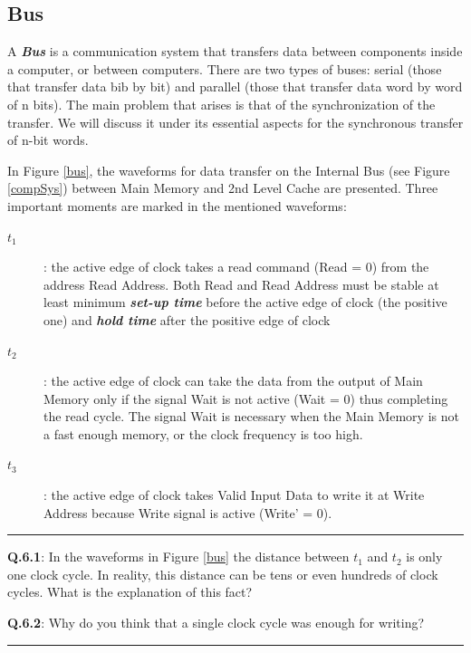 \subsection{Bus}

A {\bf {\em Bus}} is a communication system that transfers data between components inside a computer, or between computers. There are two types of buses: serial (those that transfer data bib by bit) and parallel (those that transfer data word by word of n bits). The main problem that arises is that of the synchronization of the transfer. We will discuss it under its essential aspects for the synchronous transfer of n-bit words.

In Figure \ref{bus}, the waveforms for data transfer on the Internal Bus (see Figure \ref{compSys}) between Main Memory and 2nd Level Cache are presented. Three important moments are marked in the mentioned waveforms:
\begin{description}
    \item[$t_1$]: the active edge of clock takes a read command (Read = 0) from the address Read Address. Both Read and Read Address must be stable at least minimum {\bf {\em  set-up time}} before the active edge of clock (the positive one) and {\bf {\em hold time}} after the positive edge of clock
    \item[$t_2$]: the active edge of clock can take the data from the output of Main Memory only if the signal Wait is not active (Wait = 0) thus completing the read cycle. The signal Wait is necessary when the Main Memory is not a fast enough memory, or the clock frequency is too high.
    \item[$t_3$]: the active edge of clock takes Valid Input Data to write it at Write Address because Write signal is active (Write' = 0).
\end{description}


\noindent\rule{16cm}{0.8pt}

{\bf Q.6.1}: In the waveforms in Figure \ref{bus} the distance between $t_1$ and $t_2$ is only one clock cycle. In reality, this distance can be tens or even hundreds of clock cycles. What is the explanation of this fact?

\bigskip

{\bf Q.6.2}: Why do you think that a single clock cycle was enough for writing?


\noindent\rule{16cm}{0.8pt}

